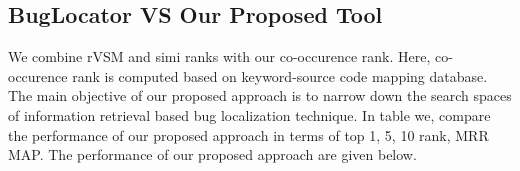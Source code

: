 \documentclass{sig-alternate}
\begin{document}
\subsection{BugLocator VS Our Proposed Tool}
We combine rVSM and simi ranks with our co-occurence rank. Here, co-occurence rank is computed based on keyword-source code mapping database. The main objective of our proposed approach is to narrow down the search spaces of information retrieval based bug localization technique. In table we, compare the performance of our proposed approach in terms of top 1, 5, 10 rank, MRR  MAP. The performance of our proposed approach are given below.
\end{document}
